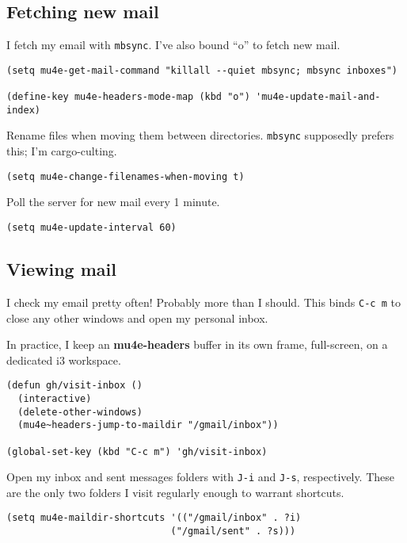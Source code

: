 \documentclass[11pt]{article}
\begin{document}
\subsection{Fetching new mail}
\label{sec:orgc1afe38}

I fetch my email with \texttt{mbsync}. I’ve also bound “o” to fetch new mail.

\begin{verbatim}
(setq mu4e-get-mail-command "killall --quiet mbsync; mbsync inboxes")

(define-key mu4e-headers-mode-map (kbd "o") 'mu4e-update-mail-and-index)
\end{verbatim}

Rename files when moving them between directories. \texttt{mbsync} supposedly prefers
this; I’m cargo-culting.

\begin{verbatim}
(setq mu4e-change-filenames-when-moving t)
\end{verbatim}

Poll the server for new mail every 1 minute.

\begin{verbatim}
(setq mu4e-update-interval 60)
\end{verbatim}
\subsection{Viewing mail}
\label{sec:orge4f4ebb}

I check my email pretty often! Probably more than I should. This binds \texttt{C-c m}
to close any other windows and open my personal inbox.

In practice, I keep an \textbf{mu4e-headers} buffer in its own frame, full-screen, on a
dedicated i3 workspace.

\begin{verbatim}
(defun gh/visit-inbox ()
  (interactive)
  (delete-other-windows)
  (mu4e~headers-jump-to-maildir "/gmail/inbox"))

(global-set-key (kbd "C-c m") 'gh/visit-inbox)
\end{verbatim}

Open my inbox and sent messages folders with \texttt{J-i} and \texttt{J-s}, respectively.
These are the only two folders I visit regularly enough to warrant shortcuts.

\begin{verbatim}
(setq mu4e-maildir-shortcuts '(("/gmail/inbox" . ?i)
                             ("/gmail/sent" . ?s)))
\end{verbatim}
\end{document}
